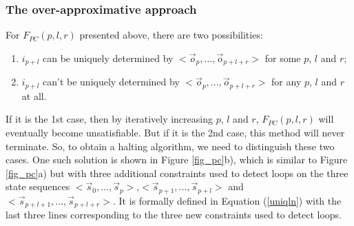 \documentclass[runningheads,a4paper,orivec]{llncs}
\begin{document}
% 
% 
% 



\subsubsection{The over-approximative approach}\label{subsub_complete}
For $F_{PC}(p,l,r)$ presented above,
there are two possibilities:
\begin{enumerate}
 \item 
$i_{p+l}$ can be uniquely determined by $<\vec{o}_{p},\dots,\vec{o}_{p+l+r}>$ for some $p$, $l$ and $r$;
 \item 
$i_{p+l}$ can't be uniquely determined by $<\vec{o}_{p},\dots,\vec{o}_{p+l+r}>$ for any $p$, $l$ and $r$ at all.
\end{enumerate}

If it is the 1st case,
then by iteratively increasing  $p$, $l$ and $r$,
$F_{PC}(p,l,r)$ will eventually become unsatisfiable.
But if it is the 2nd case,
this method will never terminate.
So,
to obtain a halting algorithm,
we need to distinguish these two cases.
One such solution is shown in Figure \ref{fig_pc}b),
which is similar to Figure \ref{fig_pc}a) but with three additional constraints used to detect loops 
on the three state sequences $<\vec{s}_{0},\dots,\vec{s}_{p}>$,$<\vec{s}_{p+1},\dots,\vec{s}_{p+l}>$ and 
$<\vec{s}_{p+l+1},\dots,\vec{s}_{p+l+r}>$.
It is formally defined in Equation (\ref{uniqln}) with the last three lines corresponding to the three new constraints used to detect loops.
\end{document}
